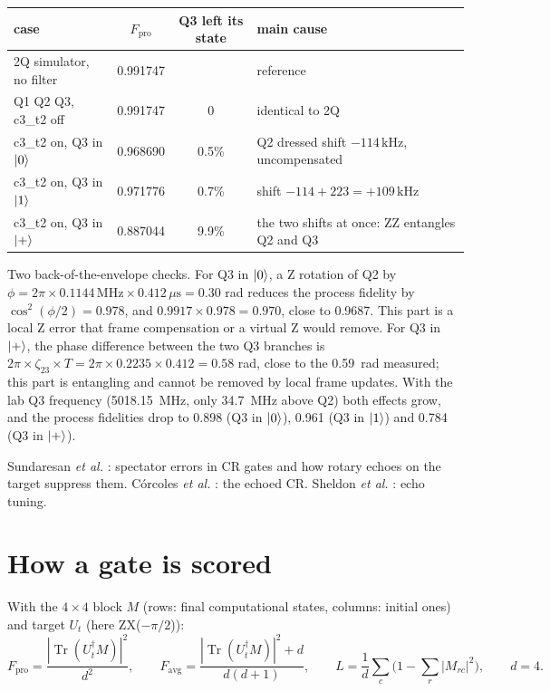 \documentclass[11pt,a4paper]{article}
\newcommand{\Tr}{\operatorname{Tr}}
\newcommand{\MHz}{\,\mathrm{MHz}}
\newcommand{\kHz}{\,\mathrm{kHz}}
\newcommand{\us}{\,\mu\mathrm{s}}
\begin{document}
\begin{center}\small
\begin{tabular}{@{}l c c l@{}}
\toprule
case & \(F_{\text{pro}}\) & Q3 left its state & main cause \\
\midrule
2Q simulator, no filter & 0.991747 & & reference \\
Q1 Q2 Q3, c3\_t2 off & 0.991747 & 0 & identical to 2Q \\
c3\_t2 on, Q3 in \(\ket{0}\) & 0.968690 & 0.5\% & Q2 dressed shift \(-114\kHz\), uncompensated \\
c3\_t2 on, Q3 in \(\ket{1}\) & 0.971776 & 0.7\% & shift \(-114 + 223 = +109\kHz\) \\
c3\_t2 on, Q3 in \(\ket{+}\) & 0.887044 & 9.9\% & the two shifts at once: ZZ entangles Q2 and Q3 \\
\bottomrule
\end{tabular}
\end{center}

Two back-of-the-envelope checks. For Q3 in \(\ket{0}\), a Z rotation of Q2 by
\(\phi = 2\pi\times0.1144\MHz\times0.412\us = 0.30\) rad reduces the process fidelity by \(\cos^2(\phi/2) = 0.978\), and
\(0.9917\times0.978 = 0.970\), close to 0.9687. This part is a local Z error that frame compensation or a virtual Z
would remove. For Q3 in \(\ket{+}\), the phase difference between the two Q3 branches is
\(2\pi\times\zeta_{23}\times T = 2\pi\times0.2235\times0.412 = 0.58\) rad, close to the 0.59~rad measured; this part is
entangling and cannot be removed by local frame updates. With the lab Q3 frequency (5018.15~MHz, only 34.7~MHz above
Q2) both effects grow, and the process fidelities drop to 0.898 (Q3 in \(\ket{0}\)), 0.961 (Q3 in \(\ket{1}\)) and
0.784 (Q3 in \(\ket{+}\)).

\begin{readbox}
Sundaresan \emph{et al.} \cite{sundaresan2020}: spectator errors in CR gates and how rotary echoes on the target
suppress them. C\'orcoles \emph{et al.} \cite{corcoles2013}: the echoed CR. Sheldon \emph{et al.} \cite{sheldon2016}:
echo tuning.
\end{readbox}

\section{How a gate is scored}\label{sec:fidelity}

With the \(4\times4\) block \(M\) (rows: final computational states, columns: initial ones) and target \(U_t\) (here
ZX(\(-\pi/2\))):
\[
F_{\text{pro}} = \frac{|\Tr(U_t^\dagger M)|^2}{d^2},\qquad
F_{\text{avg}} = \frac{|\Tr(U_t^\dagger M)|^2 + d}{d(d+1)},\qquad
L = \frac1d\sum_c\Big(1-\sum_r |M_{rc}|^2\Big),\qquad d = 4 .
\]
\end{document}
